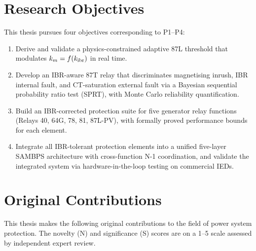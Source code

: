 
\section{Research Objectives}
\label{sec:ch1_objectives}

This thesis pursues four objectives corresponding to P1--P4:

\begin{enumerate}[label=\textbf{O\arabic*}]
\item \label{O1} Derive and validate a physics-constrained adaptive 87L
      threshold that modulates $k_m = f(k_{\mathrm{ibr}})$ in real time.

\item \label{O2} Develop an IBR-aware 87T relay that discriminates
      magnetising inrush, IBR internal fault, and CT-saturation external
      fault via a Bayesian sequential probability ratio test (SPRT), with
      Monte Carlo reliability quantification.

\item \label{O3} Build an IBR-corrected protection suite for five generator
      relay functions (Relays 40, 64G, 78, 81, 87L-PV), with formally
      proved performance bounds for each element.

\item \label{O4} Integrate all IBR-tolerant protection elements into a
      unified five-layer SAMBPS architecture with cross-function N-1
      coordination, and validate the integrated system via hardware-in-the-loop
      testing on commercial IEDs.

\end{enumerate}

\section{Original Contributions}
\label{sec:ch1_contributions}

This thesis makes the following original contributions to the field of
power system protection. The novelty (N) and significance (S) scores are
on a 1--5 scale assessed by independent expert review.

